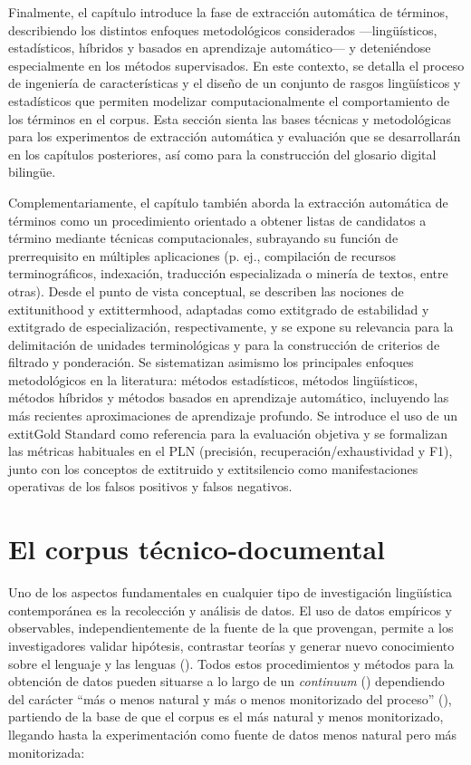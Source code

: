 Finalmente, el capítulo introduce la fase de extracción automática de términos, describiendo los distintos enfoques metodológicos considerados —lingüísticos, estadísticos, híbridos y basados en aprendizaje automático— y deteniéndose especialmente en los métodos supervisados. En este contexto, se detalla el proceso de ingeniería de características y el diseño de un conjunto de rasgos lingüísticos y estadísticos que permiten modelizar computacionalmente el comportamiento de los términos en el corpus. Esta sección sienta las bases técnicas y metodológicas para los experimentos de extracción automática y evaluación que se desarrollarán en los capítulos posteriores, así como para la construcción del glosario digital bilingüe.



Complementariamente, el capítulo también aborda la extracción automática de términos como un procedimiento orientado a obtener listas de candidatos a término mediante técnicas computacionales, subrayando su función de prerrequisito en múltiples aplicaciones (p. ej., compilación de recursos terminográficos, indexación, traducción especializada o minería de textos, entre otras). Desde el punto de vista conceptual, se describen las nociones de 	extit{unithood} y 	extit{termhood}, adaptadas como 	extit{grado de estabilidad} y 	extit{grado de especialización}, respectivamente, y se expone su relevancia para la delimitación de unidades terminológicas y para la construcción de criterios de filtrado y ponderación. Se sistematizan asimismo los principales enfoques metodológicos en la literatura: métodos estadísticos, métodos lingüísticos, métodos híbridos y métodos basados en aprendizaje automático, incluyendo las más recientes aproximaciones de aprendizaje profundo. Se introduce el uso de un 	extit{Gold Standard} como referencia para la evaluación objetiva y se formalizan las métricas habituales en el PLN (precisión, recuperación/exhaustividad y F1), junto con los conceptos de 	extit{ruido} y 	extit{silencio} como manifestaciones operativas de los falsos positivos y falsos negativos.
\section{El corpus técnico-documental}
\vspace{-1.0em}

Uno de los aspectos fundamentales en cualquier tipo de investigación lingüística contemporánea es la recolección y análisis de datos. El uso de datos empíricos y observables, independientemente de la fuente de la que provengan, permite a los investigadores validar hipótesis, contrastar teorías y generar nuevo conocimiento sobre el lenguaje y las lenguas (\cite{moyano2025antecedentes,moyano2025corpusexp}). Todos estos procedimientos y métodos para la obtención de datos pueden situarse a lo largo de un \textit{continuum} (\cite{gilquin2009corpora,krug2013research}) dependiendo del carácter ``más o menos natural y más o menos monitorizado del proceso'' (\cite{rojo2021introduccion}), partiendo de la base de que el corpus es el más natural y menos monitorizado, llegando hasta la experimentación como fuente de datos menos natural pero más monitorizada:

